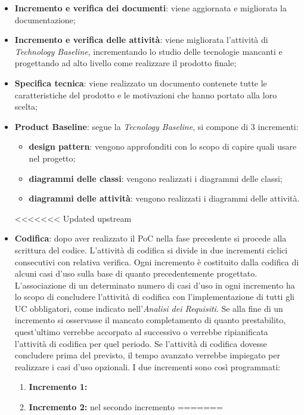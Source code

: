 \begin{itemize}
	\item \textbf{Incremento e verifica dei documenti}: viene aggiornata e migliorata la documentazione;
	\item \textbf{Incremento e verifica delle attività}: viene migliorata l’attività di \textit{Technology Baseline},  incrementando lo studio delle tecnologie mancanti e progettando ad alto livello come realizzare il prodotto finale;
	\item \textbf{Specifica tecnica}: viene realizzato un documento contenete tutte le caratteristiche del prodotto e le motivazioni che hanno portato alla loro scelta;
	\item \textbf{Product Baseline}: segue la \textit{Tecnology Baseline},  si compone di 3 incrementi:
		\begin{itemize}
			\item \textbf{design pattern}: vengono approfonditi con lo scopo di capire quali usare nel progetto;
			\item \textbf{diagrammi delle classi}: vengono realizzati i diagrammi delle classi;
			\item \textbf{diagrammi delle attività}: vengono realizzati i diagrammi delle attività.
		\end{itemize}
<<<<<<< Updated upstream
	\item \textbf{Codifica}: dopo aver realizzato il PoC nella fase precedente si procede alla scrittura del codice.  L'attività di codifica si divide in due incrementi ciclici consecutivi con relativa verifica.  Ogni incremento è costituito dalla codifica di alcuni casi d'uso sulla base di quanto precedentemente progettato.  L’associazione di un determinato numero di casi d’uso in ogni incremento ha lo scopo di concludere l'attività di codifica con l’implementazione di tutti gli UC obbligatori,  come indicato nell'\textit{Analisi dei Requisiti}.  Se alla fine di un incremento si osservasse il mancato completamento di quanto prestabilito,  quest’ultimo verrebbe accorpato al successivo o verrebbe ripianificata l’attività di codifica per quel periodo. Se l'attività di codifica dovesse concludere prima del previsto,  il tempo avanzato verrebbe impiegato per realizzare i casi d'uso opzionali.  I due incrementi sono così programmati:
		\begin{enumerate}
			\item \textbf{Incremento 1:} 
			\item \textbf{Incremento 2:} nel secondo incremento 
=======

\end{enumerate}
\end{itemize}
